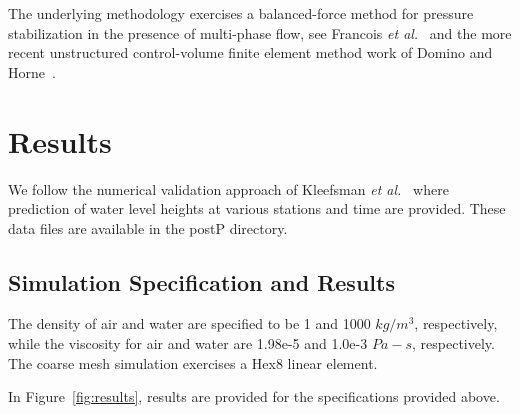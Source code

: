 \documentclass{article}
\begin{document}
The underlying methodology exercises a balanced-force method for pressure stabilization
in the presence of multi-phase flow, see Francois \textit{et al.}~\cite{francois2006} and
the more recent unstructured control-volume finite element method work of Domino and 
Horne~\cite{dominoHorne2022}.

\section{Results}
We follow the numerical validation approach of Kleefsman \textit{et al.}~\cite{kleefsman2005}
where prediction of water level heights at various stations and time are provided. These
data files are available in the postP directory.

\subsection{Simulation Specification and Results}

The density of air and water are specified to be 1 and 1000 $kg/m^3$, respectively,
while the viscosity for air and water are 1.98e-5 and 1.0e-3 $Pa-s$, respectively. The 
coarse mesh simulation exercises a Hex8 linear element.

In Figure~\ref{fig:results}, results are provided for the specifications
provided above.
\end{document}
